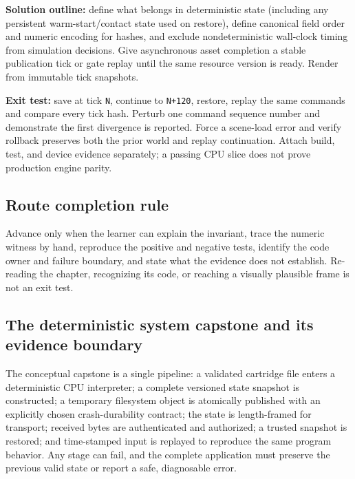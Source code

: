 \textbf{Solution outline:} define what belongs in deterministic state (including any persistent warm-start/contact state used on restore), define canonical field order and numeric encoding for hashes, and exclude nondeterministic wall-clock timing from simulation decisions. Give asynchronous asset completion a stable publication tick or gate replay until the same resource version is ready. Render from immutable tick snapshots.

\textbf{Exit test:} save at tick \texttt{N}, continue to \texttt{N+120}, restore, replay the same commands and compare every tick hash. Perturb one command sequence number and demonstrate the first divergence is reported. Force a scene-load error and verify rollback preserves both the prior world and replay continuation. Attach build, test, and device evidence separately; a passing CPU slice does not prove production engine parity.

\subsection{Route completion rule}\label{06-engine-ii-ch042-route-completion-rule}

\hypertarget{06-engine-ii-ch042-route-completion-rule}{}

Advance only when the learner can explain the invariant, trace the numeric witness by hand, reproduce the positive and negative tests, identify the code owner and failure boundary, and state what the evidence does not establish. Re-reading the chapter, recognizing its code, or reaching a visually plausible frame is not an exit test.

\subsection{The deterministic system capstone and its evidence boundary}\label{06-engine-ii-ch042-the-deterministic-system-capstone-and-its-evidence-boundary}

\hypertarget{06-engine-ii-ch042-the-deterministic-system-capstone-and-its-evidence-boundary}{}

The conceptual capstone is a single pipeline: a validated cartridge file enters a deterministic CPU interpreter; a complete versioned state snapshot is constructed; a temporary filesystem object is atomically published with an explicitly chosen crash-durability contract; the state is length-framed for transport; received bytes are authenticated and authorized; a trusted snapshot is restored; and time-stamped input is replayed to reproduce the same program behavior. Any stage can fail, and the complete application must preserve the previous valid state or report a safe, diagnosable error.

